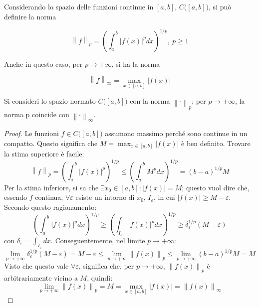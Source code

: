 \documentclass[11pt, a4paper]{scrartcl}
\theoremstyle{definition}
\numberwithin{esempio}{section}
\theoremstyle{definition}
\numberwithin{obs}{section}
\numberwithin{nota}{section}
\newenvironment{boxenv}[1][]{
    \begin{eqbox}[#1]
    }{
   \end{eqbox}
}
\numberwithin{equation}{subsection}
\begin{document}
Considerando lo spazio delle funzioni continue in $[a,b]$, $C\big([a,b]\big)$, si pu\`o definire la norma
\begin{boxenv}[]
\begin{equation}
	\left\lVert f \right\rVert _p = \left(\int_{a} ^b \lvert f(x) \rvert ^p dx\right) ^{1 / p} , \ p\ge 1
\end{equation}
\end{boxenv}
\noindent Anche in questo caso, per $p\to +\infty$, si ha la norma
\begin{boxenv}[]
\begin{equation}
	\left\lVert f \right\rVert _\infty= \max _{x \in [a,b]}  \lvert f(x) \rvert 
\end{equation}
\end{boxenv}
\begin{prop}
	{}{}
	Si consideri lo spazio normato $C\big([a,b]\big)$ con la norma $\left\lVert \cdot   \right\rVert _p$; per $p\to +\infty$, la norma p coincide con $\left\lVert \cdot  \right\rVert _\infty$.
	\begin{proof}
		Le funzioni $f \in C\big([a,b]\big)$ assumono massimo perch\'e sono continue in un compatto. 
		Questo significa che $M = \displaystyle \max_{x \in [a,b]} \lvert f(x) \rvert $ \`e ben definito.
		Trovare la stima superiore \`e facile:
		\begin{equation*}
			\left\lVert f \right\rVert _p = \left(\int_{a} ^b \lvert f(x) \rvert ^p\right) ^{1 / p} \le \left(\int_{a} ^b M^p dx \right) ^{1/p}  = (b-a)^{1/p} M
		\end{equation*}
		Per la stima inferiore, si sa che $\exists x_0 \in [a,b]:\lvert f(x) \rvert = M$; questo vuol dire che, essendo $f$ continua, $\forall \varepsilon $ esiste un intorno di $x_0$, $I_\varepsilon $, in cui $\lvert f(x) \rvert \ge M-\varepsilon $.
		Secondo questo ragionamento:
		\[
		\left(\int_{a} ^b \lvert f(x) \rvert^{p}  dx\right) ^{1/p} \ge \left(\int_{I_\varepsilon } \lvert f(x) \rvert ^p dx\right) ^{1 / p} \ge \delta _\varepsilon ^{1 / p} (M-\varepsilon )
		\] 
		con $\delta _\varepsilon = \int_{I_\varepsilon } dx$.
		Conseguentemente, nel limite $p\to +\infty$:
		\[
		\lim_{p \to +\infty} \delta _\varepsilon ^{1/p} (M-\varepsilon ) = M-\varepsilon \le \lim_{p \to +\infty} \left\lVert f(x) \right\rVert _p \le \lim_{p \to +\infty} (b-a)^{1 / p} M= M
		\] 
		Visto che questo vale $\forall \varepsilon $, significa che, per $p\to +\infty$, $\left\lVert f(x) \right\rVert _p$ \`e arbitrariamente vicino a $M$, quindi:
		\[
			\lim_{p \to +\infty} \left\lVert f(x) \right\rVert _p = M = \max_{x \in [a,b]} \lvert f(x) \rvert = \left\lVert f(x) \right\rVert _\infty
		\] 
	\end{proof}
\end{prop}
\end{document}
